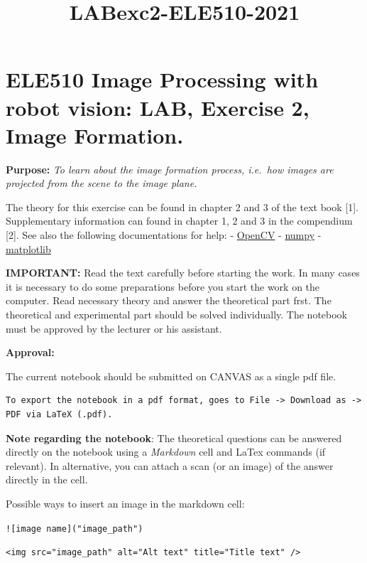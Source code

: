 \documentclass[border=1in]{standalone}
\title{LABexc2-ELE510-2021}
\begin{document}
    \begin{minipage}{21cm}

    

    
    \hypertarget{ele510-image-processing-with-robot-vision-lab-exercise-2-image-formation.}{%
\section{ELE510 Image Processing with robot vision: LAB, Exercise 2,
Image
Formation.}\label{ele510-image-processing-with-robot-vision-lab-exercise-2-image-formation.}}

    \textbf{Purpose:} \emph{To learn about the image formation process,
i.e.~how images are projected from the scene to the image plane.}

The theory for this exercise can be found in chapter 2 and 3 of the text
book {[}1{]}. Supplementary information can found in chapter 1, 2 and 3
in the compendium {[}2{]}. See also the following documentations for
help: - \href{https://opencv.org/opencv-python-free-course/}{OpenCV} -
\href{https://numpy.org/doc/stable/}{numpy} -
\href{https://matplotlib.org/stable/contents.html}{matplotlib}

\textbf{IMPORTANT:} Read the text carefully before starting the work. In
many cases it is necessary to do some preparations before you start the
work on the computer. Read necessary theory and answer the theoretical
part frst. The theoretical and experimental part should be solved
individually. The notebook must be approved by the lecturer or his
assistant.

\textbf{Approval:}

The current notebook should be submitted on CANVAS as a single pdf file.

\begin{verbatim}
To export the notebook in a pdf format, goes to File -> Download as -> PDF via LaTeX (.pdf).
\end{verbatim}

\textbf{Note regarding the notebook}: The theoretical questions can be
answered directly on the notebook using a \emph{Markdown} cell and LaTex
commands (if relevant). In alternative, you can attach a scan (or an
image) of the answer directly in the cell.

Possible ways to insert an image in the markdown cell:

\texttt{!{[}image\ name{]}("image\_path")}

\texttt{\textless{}img\ src="image\_path"\ alt="Alt\ text"\ title="Title\ text"\ /\textgreater{}}


\end{minipage}
\end{document}
